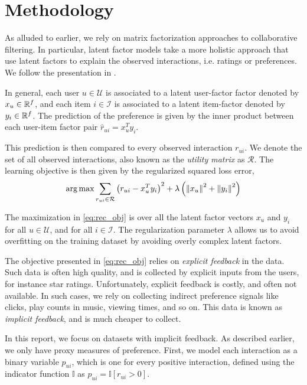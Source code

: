 \documentclass{article}
\begin{document}
\section{Methodology}\label{sec:methodology}

As alluded to earlier, we rely on matrix factorization approaches to 
collaborative filtering. In particular, latent factor models take a more 
holistic approach that use latent factors to explain the observed 
interactions, i.e. ratings or preferences. We follow the presentation in 
\citet{yifan2008}.

In general, each user $u \in \mathcal{U}$ is associated to a latent 
user-factor factor denoted by $x_u \in \mathbb{R}^f$, and each item 
$i \in \mathcal{I}$ is associated to a latent item-factor denoted by 
$y_i \in \mathbb{R}^f$. The prediction of the preference is given by the inner
product between each user-item factor pair $\widehat{r}_{ui} = x_u^Ty_i$.

This prediction is then compared to every observed interaction $r_{ui}$. 
We denote the set of all observed interactions, also known as the 
\emph{utility matrix} as $\mathcal{R}$. The learning objective is then 
given by the regularized squared loss error,
\begin{align}
\operatorname*{\arg\max} \sum_{r_{ui} \in \mathcal{R}} \left( r_{ui} - x_u^T y_i \right)^2 + \lambda \left( \left\lVert x_u\right\rVert^2 + \left\lVert y_i\right\rVert^2 \right) \label{eq:rec_obj}
\end{align}

The maximization in \cref{eq:rec_obj} is over all the latent factor vectors 
$x_u$ and $y_i$ for all $u \in \mathcal{U}$, and for all 
$i \in \mathcal{I}$. The regularization parameter $\lambda$ allows us to 
avoid overfitting on the training dataset by avoiding overly complex latent
factors.

The objective presented in \cref{eq:rec_obj} relies on 
\emph{explicit feedback} in the data. Such data is often high quality, and 
is collected by explicit inputs from the users, for instance star ratings. 
Unfortunately, explicit feedback is costly, and often not available. In 
such cases, we rely on collecting indirect preference signals like clicks, 
play counts in music, viewing times, and so on. This data is known as 
\emph{implicit feedback}, and is much cheaper to collect.

In this report, we focus on datasets with implicit feedback. As described 
earlier, we only have proxy measures of preference. First, we model each 
interaction as a binary variable $p_{ui}$, which is one for every positive
interaction, defined using the indicator function $\mathbb{I}$ as $p_{ui} = \mathbb{I}\left[ r_{ui} > 0 \right]$.
\end{document}

